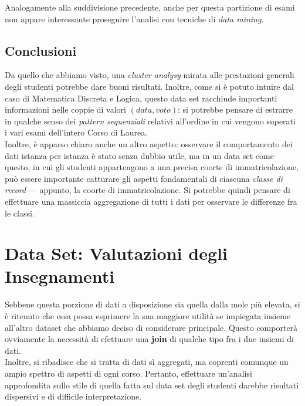                 Analogamente alla suddivisione precedente, anche per questa partizione di esami non appare interessante proseguire l'analisi con tecniche di \textit{data mining}.

        \subsection{Conclusioni}

            Da quello che abbiamo visto, una \textit{cluster analysy} mirata alle prestazioni generali degli studenti potrebbe dare buoni risultati. Inoltre, come si è potuto intuire dal caso di Matematica Discreta e Logica, questo data set racchiude importanti informazioni nelle coppie di valori $(data, voto)$: si potrebbe pensare di estrarre in qualche senso dei \textit{pattern sequenziali} relativi all'ordine in cui vengono superati i vari esami dell'intero Corso di Laurea. \\

            Inoltre, è apparso chiaro anche un altro aspetto: osservare il comportamento dei dati istanza per istanza è stato senza dubbio utile, ma in un data set come questo, in cui gli studenti appartengono a una precisa coorte di immatricolazione, può essere importante catturare gli aspetti fondamentali di ciascuna \textit{classe di record} --- appunto, la coorte di immatricolazione. Si potrebbe quindi pensare di effettuare una massiccia aggregazione di tutti i dati per osservare le differenze fra le classi.

    \section{Data Set: Valutazioni degli Insegnamenti}

        Sebbene questa porzione di dati a disposizione sia quella dalla mole più elevata, si è ritenuto che essa possa esprimere la sua maggiore utilità se impiegata insieme all'altro dataset che abbiamo deciso di considerare principale. Questo comporterà ovviamente la necessità di efettuare una \textbf{join} di qualche tipo fra i due insiemi di dati.\\
        
        Inoltre, si ribadisce che si tratta di dati sì aggregati, ma coprenti comunque un ampio spettro di aspetti di ogni corso. Pertanto, effettuare un'analisi approfondita sullo stile di quella fatta sul data set degli studenti darebbe risultati dispersivi e di difficile interpretazione. \\

